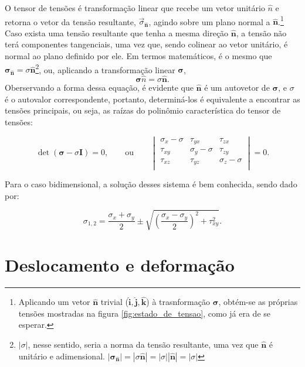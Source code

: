 O tensor de tensões é transformação linear que recebe um vetor unitário $\hat{n}$ e retorna o vetor da tensão resultante, $\vec{\sigma}_{\bm{\hat{n}}}$, agindo sobre um plano normal a $\bm{\hat{n}}$.\footnote{Aplicando um vetor $\bm{\hat{n}}$ trivial ($\bm{\hat{i}}, \bm{\hat{j}}, \bm{\hat{k}}$) à trasnformação $\bm{\sigma}$, obtém-se as próprias tensões mostradas na figura \ref{fig:estado_de_tensao}, como já era de se esperar.} Caso exista uma tensão resultante que tenha a mesma direção $\bm{\hat{n}}$, a tensão não terá componentes tangenciais, uma vez que, sendo colinear ao vetor unitário, é normal ao plano definido por ele. Em termos matemáticos, é o mesmo que $\bm{\sigma}_{\bm{\hat{n}}} = \sigma \bm{\hat{n}}$\footnote{$|\sigma|$, nesse sentido, seria a norma da tensão resultante, uma vez que $\bm{\hat{n}}$ é unitário e adimensional. $ |\bm{\sigma}_{\bm{\hat{n}}}| = |\sigma \bm{\hat{n}}| = |\sigma| |\bm{\hat{n}}| = |\sigma| $}, ou, aplicando a transformação linear $\bm{\sigma}$,
\begin{equation}
    \bm{\sigma}\hat{n} = \sigma \bm{\hat{n}}.
\end{equation}
Oberservando a forma dessa equação, é evidente que $\bm{\hat{n}}$ é um autovetor de $\bm{\sigma}$, e $\sigma$ é o autovalor correspondente, portanto, determiná-los é equivalente a encontrar as tensões principais, ou seja, as raízas do polinômio característica do tensor de tensões:

\begin{equation}
    \det{(\bm{\sigma} - \sigma \bm{I})} = 0, \qquad \text{ou} \qquad \begin{vmatrix}
        \sigma_x - \sigma & \tau_{yx} & \tau_{zx} \\
        \tau_{xy} & \sigma_{y} - \sigma & \tau_{zy} \\
        \tau_{xz} & \tau_{yz} & \sigma_{z} - \sigma \\
    \end{vmatrix} = 0.
\end{equation}

Para o caso bidimensional, a solução desses sistema é bem conhecida, sendo dado por:

\begin{equation}
    \sigma_{1,2} = \frac{\sigma_x + \sigma_y}{2} \pm \sqrt{\left(\frac{\sigma_x - \sigma_y}{2}\right)^2 + \tau_{xy}^2}.
\end{equation}

\section{Deslocamento e deformação}


